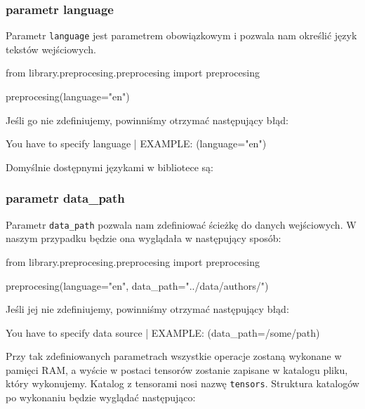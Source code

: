 \subsubsection{parametr language}
Parametr \texttt{language} jest parametrem obowiązkowym i pozwala nam określić język tekstów wejściowych.
\begin{python}
from library.preprocesing.preprocesing import preprocesing

preprocesing(language="en")

\end{python}

Jeśli go nie zdefiniujemy, powinniśmy otrzymać następujący błąd:

\begin{consolerror}
You have to specify language | EXAMPLE: (language="en")
\end{consolerror}

Domyślnie dostępnymi językami w bibliotece są:

\languages 

\subsubsection{parametr data\_path}
Parametr \texttt{data\_path} pozwala nam zdefiniować ścieżkę do danych wejściowych. W naszym przypadku
będzie ona wyglądała w następujący sposób:
\begin{python}
from library.preprocesing.preprocesing import preprocesing

preprocesing(language="en",
              data_path="../data/authors/")
                   
\end{python}

Jeśli jej nie zdefiniujemy, powinniśmy otrzymać następujący błąd:

\begin{consolerror}
You have to specify data source | EXAMPLE: (data_path=/some/path)
\end{consolerror}

Przy tak zdefiniowanych parametrach wszystkie operacje zostaną wykonane w pamięci RAM, a wyście w postaci
tensorów zostanie zapisane w katalogu pliku, który wykonujemy. Katalog z tensorami nosi nazwę \texttt{tensors}.
Struktura katalogów po wykonaniu będzie wyglądać następująco:

\myspace
{}
\myspace

